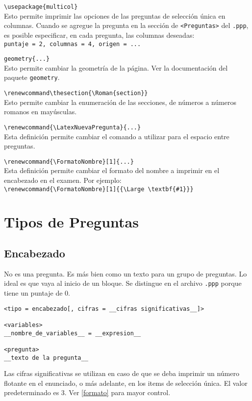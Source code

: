 \documentclass[12pt]{article}
\theoremstyle{definition}
\begin{document}
\noindent \verb|\usepackage{multicol}| \\
Esto permite imprimir las opciones de las preguntas de selecci\'on \'unica en columnas. Cuando se agregue la pregunta en la secci\'on de \verb|<Preguntas>| del \verb|.ppp|, es posible especificar, en cada pregunta, las columnas deseadas: \\
\verb|puntaje = 2, columnas = 4, origen = ...|
\medskip

\noindent \verb|geometry{...}| \\
  Esto permite cambiar la geometr\'ia de la p\'agina. Ver la documentaci\'on del paquete \verb|geometry|.
\medskip

\noindent \verb|\renewcommand\thesection{\Roman{section}}| \\
  Esto permite cambiar la enumeraci\'on de las secciones, de n\'umeros a n\'umeros romanos en may\'usculas.

\noindent \verb|\renewcommand{\LatexNuevaPregunta}{...}| \\
Esta definici\'on permite cambiar el comando a utilizar para el espacio entre preguntas.
\medskip

\noindent \verb|\renewcommand{\FormatoNombre}[1]{...}| \\
Esta definici\'on permite cambiar el formato del nombre a imprimir en el encabezado en el examen. Por ejemplo: \\
\verb|\renewcommand{\FormatoNombre}[1]{{\Large \textbf{#1}}}|
\medskip


\section{Tipos de Preguntas}

\subsection{Encabezado}
No es una pregunta. Es más bien como un texto para un grupo de preguntas. Lo ideal es que vaya al inicio de un bloque. Se distingue en el archivo \verb|.ppp| porque tiene un puntaje de 0.

\small
\begin{verbatim}
<tipo = encabezado[, cifras = __cifras significativas__]>

<variables>
__nombre_de_variables__ = __expresion__

<pregunta>
__texto de la pregunta__
\end{verbatim}
\normalsize

Las cifras significativas se utilizan en caso de que se deba imprimir un número flotante en el enunciado, o más adelante, en los items de selección única. El valor predeterminado es 3. Ver \ref{formato} para mayor control.
\end{document}
